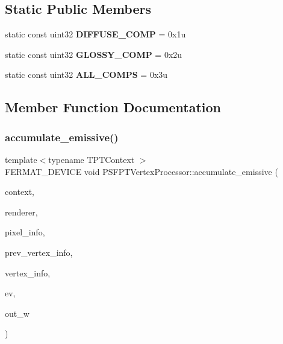 \subsection*{Static Public Members}
\begin{DoxyCompactItemize}
\item 
\mbox{\label{struct_p_s_f_p_t_vertex_processor_ad6ebf01a656fb12d4d75c984fa670cc0}} 
static const uint32 {\bfseries D\+I\+F\+F\+U\+S\+E\+\_\+\+C\+O\+MP} = 0x1u
\item 
\mbox{\label{struct_p_s_f_p_t_vertex_processor_a7d811ca8aae646e66eb1a60c32c0973b}} 
static const uint32 {\bfseries G\+L\+O\+S\+S\+Y\+\_\+\+C\+O\+MP} = 0x2u
\item 
\mbox{\label{struct_p_s_f_p_t_vertex_processor_a3b192d116d958831b39dca190d397393}} 
static const uint32 {\bfseries A\+L\+L\+\_\+\+C\+O\+M\+PS} = 0x3u
\end{DoxyCompactItemize}


\subsection{Member Function Documentation}
\mbox{\label{struct_p_s_f_p_t_vertex_processor_adda9f64bfaa107052fd35576c5479bf3}} 
\subsubsection{\texorpdfstring{accumulate\+\_\+emissive()}{accumulate\_emissive()}}
{\footnotesize\ttfamily template$<$typename T\+P\+T\+Context $>$ \\
F\+E\+R\+M\+A\+T\+\_\+\+D\+E\+V\+I\+CE void P\+S\+F\+P\+T\+Vertex\+Processor\+::accumulate\+\_\+emissive (\begin{DoxyParamCaption}\item[{const T\+P\+T\+Context \&}]{context,  }\item[{\hyperlink{struct_rendering_context_view}{Rendering\+Context\+View} \&}]{renderer,  }\item[{const \hyperlink{union_pixel_info}{Pixel\+Info}}]{pixel\+\_\+info,  }\item[{const uint32}]{prev\+\_\+vertex\+\_\+info,  }\item[{const uint32}]{vertex\+\_\+info,  }\item[{const \hyperlink{struct_eye_vertex}{Eye\+Vertex} \&}]{ev,  }\item[{const \hyperlink{structcugar_1_1_vector}{cugar\+::\+Vector3f} \&}]{out\+\_\+w }\end{DoxyParamCaption})\hspace{0.3cm}{\ttfamily [inline]}}



